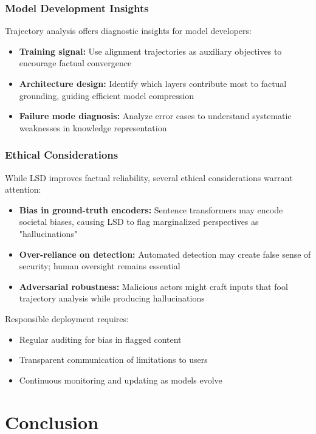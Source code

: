 \documentclass[11pt]{article}
\begin{document}
\subsubsection{Model Development Insights}

Trajectory analysis offers diagnostic insights for model developers:
\begin{itemize}[leftmargin=*]
    \item \textbf{Training signal:} Use alignment trajectories as auxiliary objectives to encourage factual convergence
    \item \textbf{Architecture design:} Identify which layers contribute most to factual grounding, guiding efficient model compression
    \item \textbf{Failure mode diagnosis:} Analyze error cases to understand systematic weaknesses in knowledge representation
\end{itemize}

\subsubsection{Ethical Considerations}

While LSD improves factual reliability, several ethical considerations warrant attention:
\begin{itemize}[leftmargin=*]
    \item \textbf{Bias in ground-truth encoders:} Sentence transformers may encode societal biases, causing LSD to flag marginalized perspectives as "hallucinations"
    \item \textbf{Over-reliance on detection:} Automated detection may create false sense of security; human oversight remains essential
    \item \textbf{Adversarial robustness:} Malicious actors might craft inputs that fool trajectory analysis while producing hallucinations
\end{itemize}

Responsible deployment requires:
\begin{itemize}[leftmargin=*]
    \item Regular auditing for bias in flagged content
    \item Transparent communication of limitations to users
    \item Continuous monitoring and updating as models evolve
\end{itemize}

\section{Conclusion}
\label{sec:conclusion}
\end{document}
